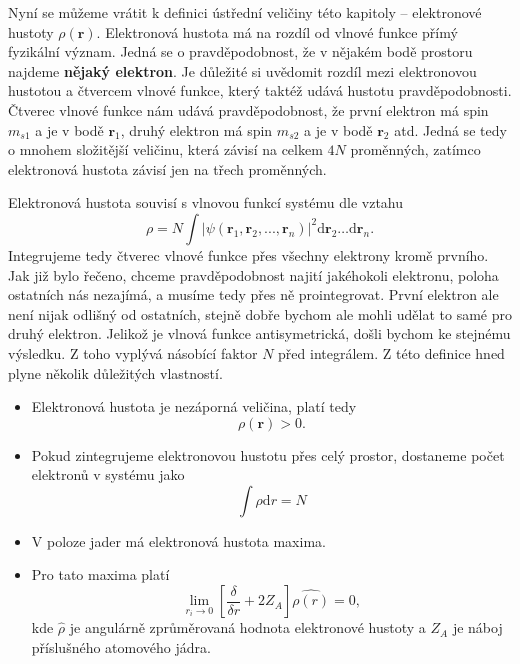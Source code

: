 Nyní se můžeme vrátit k definici ústřední veličiny této kapitoly -- elektronové hustoty $\rho(\mathbf{r})$.
Elektronová hustota má na rozdíl od vlnové funkce přímý fyzikální význam. Jedná se o pravděpodobnost, že v nějakém bodě prostoru najdeme \textbf{nějaký elektron}. Je důležité si uvědomit rozdíl mezi elektronovou hustotou a čtvercem vlnové funkce, který taktéž udává hustotu pravděpodobnosti. Čtverec vlnové funkce nám udává pravděpodobnost, že první elektron má spin $m_{s1}$ a je v bodě $\mathbf{r}_1$, druhý elektron má spin $m_{s2}$ a je v bodě $\mathbf{r}_2$ atd. Jedná se tedy o mnohem složitější veličinu, která závisí na celkem $4N$ proměnných, zatímco elektronová hustota závisí jen na třech proměnných.

Elektronová hustota souvisí s vlnovou funkcí systému dle vztahu
\begin{equation}
\rho=N \int |\psi(\textbf{r}_1,\textbf{r}_2,...,\textbf{r}_n)|^2 \mathrm{d}\textbf{r}_2\dots\mathrm{d}\textbf{r}_n .
\label{rov:dft:defrho}
\end{equation}
Integrujeme tedy čtverec vlnové funkce přes všechny elektrony kromě prvního. Jak již bylo řečeno, chceme pravděpodobnost najití jakéhokoli elektronu, poloha ostatních nás nezajímá, a musíme tedy přes ně prointegrovat. První elektron ale není nijak odlišný od ostatních, stejně dobře bychom ale mohli udělat to samé pro druhý elektron. Jelikož je vlnová funkce antisymetrická, došli bychom ke stejnému výsledku. Z toho vyplývá násobící faktor $N$ před integrálem.
Z této definice hned plyne několik důležitých vlastností.

\begin{itemize}
\item Elektronová hustota je nezáporná veličina, platí tedy
\begin{equation}
\rho(\mathbf{r})  > 0 .
\end{equation}
\item Pokud zintegrujeme elektronovou hustotu přes celý prostor, dostaneme počet elektronů v systému jako
\begin{equation}
\int \rho\mathrm{d}r = N
\end{equation}

\item V poloze jader má elektronová hustota maxima.
\item Pro tato maxima platí
\begin{equation}
\lim_{r_i \to 0} \left[ \frac{\delta}{\delta r}+2Z_A\right]\hat{\rho(r)}=0, 
\end{equation}
kde $\hat{\rho}$ je angulárně zprůměrovaná hodnota elektronové hustoty a $Z_A$ je náboj příslušného atomového jádra.
\end{itemize}

